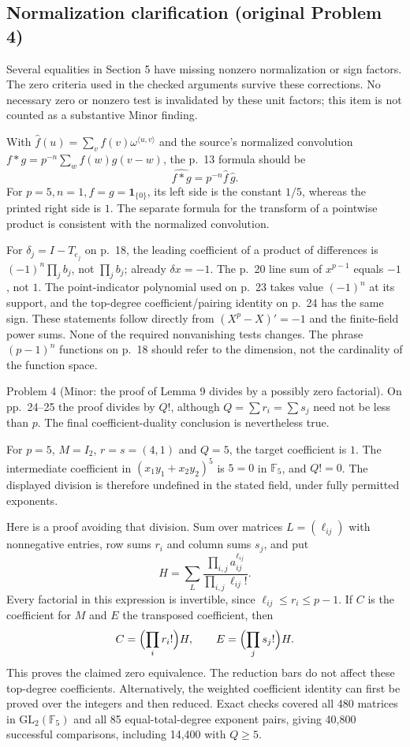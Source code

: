 \documentclass[10pt]{article}
\begin{document}
\subsection*{Normalization clarification (original Problem 4)}
Several equalities in Section 5 have missing nonzero normalization or sign factors. The zero criteria used in the checked arguments survive these corrections. No necessary zero or nonzero test is invalidated by these unit factors; this item is not counted as a substantive Minor finding.\par
With \(\widehat f(u)=\sum_vf(v)\omega^{\langle u,v\rangle}\) and the source’s normalized convolution \(f*g=p^{-n}\sum_wf(w)g(v-w)\), the p. 13 formula should be \[\widehat{f*g}=p^{-n}\widehat f\,\widehat g.\] For \(p=5,n=1,f=g=\mathbf1_{\{0\}}\), its left side is the constant \(1/5\), whereas the printed right side is \(1\). The separate formula for the transform of a pointwise product is consistent with the normalized convolution.\par
For \(\delta_j=I-T_{e_j}\) on p. 18, the leading coefficient of a product of differences is \((-1)^n\prod_jb_j\), not \(\prod_jb_j\); already \(\delta x=-1\). The p. 20 line sum of \(x^{p-1}\) equals \(-1\), not \(1\). The point-indicator polynomial used on p. 23 takes value \((-1)^n\) at its support, and the top-degree coefficient/pairing identity on p. 24 has the same sign. These statements follow directly from \((X^p-X)'=-1\) and the finite-field power sums. None of the required nonvanishing tests changes. The phrase \((p-1)^n\) functions on p. 18 should refer to the dimension, not the cardinality of the function space.\par
Problem 4 (Minor: the proof of Lemma 9 divides by a possibly zero factorial).  On pp. 24–25 the proof divides by \(Q!\), although \(Q=\sum r_i=\sum s_j\) need not be less than \(p\). The final coefficient-duality conclusion is nevertheless true.\par
For \(p=5\), \(M=I_2\), \(r=s=(4,1)\) and \(Q=5\), the target coefficient is \(1\). The intermediate coefficient in \((x_1y_1+x_2y_2)^5\) is \(5=0\) in \(\mathbb F_5\), and \(Q!=0\). The displayed division is therefore undefined in the stated field, under fully permitted exponents.\par
Here is a proof avoiding that division. Sum over matrices \(L=(\ell_{ij})\) with nonnegative entries, row sums \(r_i\) and column sums \(s_j\), and put \[H=\sum_L\frac{\prod_{i,j}a_{ij}^{\ell_{ij}}}
                    {\prod_{i,j}\ell_{ij}!}.\] Every factorial in this expression is invertible, since \(\ell_{ij}\le r_i\le p-1\). If \(C\) is the coefficient for \(M\) and \(E\) the transposed coefficient, then \[C=\Bigl(\prod_i r_i!\Bigr)H,\qquad
 E=\Bigl(\prod_j s_j!\Bigr)H.\] This proves the claimed zero equivalence. The reduction bars do not affect these top-degree coefficients. Alternatively, the weighted coefficient identity can first be proved over the integers and then reduced. Exact checks covered all 480 matrices in \(\mathrm{GL}_2(\mathbb F_5)\) and all 85 equal-total-degree exponent pairs, giving 40,800 successful comparisons, including 14,400 with \(Q\ge5\).\par
\end{document}
